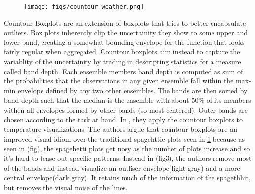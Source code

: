 


\begin{figure}
\texttt{[image: figs/countour\_weather.png]}
\label{fig:countour}
\end{figure}
Countour Boxplots \cite{whitaker13} are an extension of boxplots that tries to better encapsulate outliers. Box plots inherently clip the uncertainity they show to some upper and lower band, 
creating a somewhat bounding envelope for the function that looks fairly regular when aggregated. Countour boxplots aim instead to capture the variablity of the uncertainity by trading in descripting
statistics for a measure called band depth. Each ensemble members band depth is computed as sum of the probabilities that the observations in any given ensemble fall within the max-min envelope defined by any two other ensembles. The bands are then sorted by band depth such that the median is the ensemble with about 50\% of its members withen all envelopes formed by other bands (so most centered). Outer bands are chosen according to the task at hand. In \cite{whitaker13}, they apply the countour boxplots to temperature visualizations. %
The authors argue that countour boxplots are an improved visual idiom over the traditional spagehttie plots seen in \ref{fig:countour} because as seen in (fig), the spagehetti plots get nosy as the number of plots increase and so it's hard to tease out specific patterns. Instead in (fig3), the authors remove most of the bands and instead visualize an outliser envelope(light gray) and a more central envelope(dark gray). It retains much of the information of the spagethhit, but removes the visual noise of the lines.  
